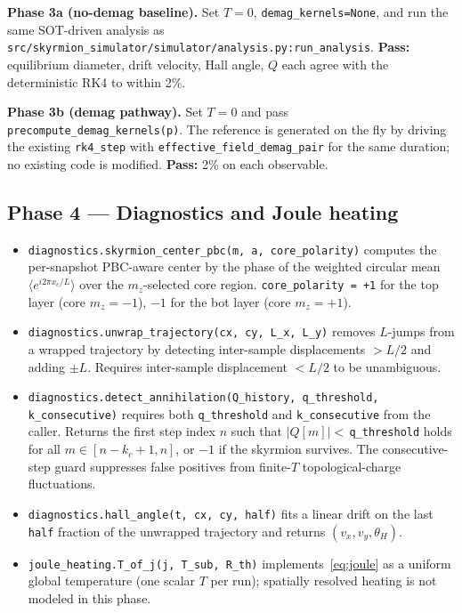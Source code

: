 \documentclass[11pt,a4paper]{article}
\begin{document}
\textbf{Phase 3a (no-demag baseline).} Set $T=0$,
\texttt{demag\_kernels=None}, and run the same SOT-driven analysis
as \texttt{src/skyrmion\_simulator/simulator/analysis.py:run\_analysis}. \textbf{Pass:}
equilibrium diameter, drift velocity, Hall angle, $Q$ each agree
with the deterministic RK4 to within 2\%.

\textbf{Phase 3b (demag pathway).} Set $T=0$ and pass
\texttt{precompute\_demag\_kernels(p)}. The reference is generated
on the fly by driving the existing \texttt{rk4\_step} with
\texttt{effective\_field\_demag\_pair} for the same duration; no
existing code is modified. \textbf{Pass:} 2\% on each observable.

\subsection{Phase 4 --- Diagnostics and Joule heating}

\begin{itemize}[leftmargin=2em]
    \item \texttt{diagnostics.skyrmion\_center\_pbc(m, a,
    core\_polarity)} computes the per-snapshot PBC-aware center by
    the phase of the weighted circular mean
    $\langle e^{i 2\pi x_c / L}\rangle$ over the $m_z$-selected core
    region. \texttt{core\_polarity = +1} for the top layer (core
    $m_z = -1$), $-1$ for the bot layer (core $m_z = +1$).
    \item \texttt{diagnostics.unwrap\_trajectory(cx, cy, L\_x, L\_y)}
    removes $L$-jumps from a wrapped trajectory by detecting
    inter-sample displacements $> L/2$ and adding $\pm L$. Requires
    inter-sample displacement $< L/2$ to be unambiguous.
    \item \texttt{diagnostics.detect\_annihilation(Q\_history,
    q\_threshold, k\_consecutive)} requires both
    \texttt{q\_threshold} and \texttt{k\_consecutive} from the
    caller. Returns the first step index $n$ such that
    $|Q[m]| < $\,\texttt{q\_threshold} holds for all $m \in
    [n - k_c + 1, n]$, or $-1$ if the skyrmion survives. The
    consecutive-step guard suppresses false positives from
    finite-$T$ topological-charge fluctuations.
    \item \texttt{diagnostics.hall\_angle(t, cx, cy, half)} fits a
    linear drift on the last \texttt{half} fraction of the unwrapped
    trajectory and returns $(v_x, v_y, \theta_H)$.
    \item \texttt{joule\_heating.T\_of\_j(j, T\_sub, R\_th)}
    implements~\eqref{eq:joule} as a uniform global temperature
    (one scalar $T$ per run); spatially resolved heating is not
    modeled in this phase.
\end{itemize}
\end{document}
